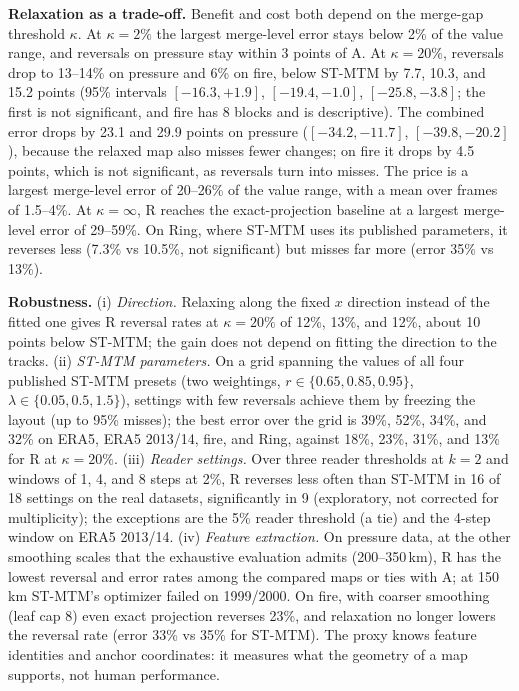 \documentclass[review]{vgtc}                 %
\begin{document}
\textbf{Relaxation as a trade-off.} Benefit and cost both depend on the merge-gap threshold $\kappa$. At $\kappa=2\%$ the largest merge-level error stays below 2\% of the value range, and reversals on pressure stay within 3 points of A. At $\kappa=20\%$, reversals drop to 13--14\% on pressure and 6\% on fire, below ST-MTM by 7.7, 10.3, and 15.2 points (95\% intervals $[-16.3,+1.9]$, $[-19.4,-1.0]$, $[-25.8,-3.8]$; the first is not significant, and fire has 8 blocks and is descriptive). The combined error drops by 23.1 and 29.9 points on pressure ($[-34.2,-11.7]$, $[-39.8,-20.2]$), because the relaxed map also misses fewer changes; on fire it drops by 4.5 points, which is not significant, as reversals turn into misses. The price is a largest merge-level error of 20--26\% of the value range, with a mean over frames of 1.5--4\%. At $\kappa=\infty$, R reaches the exact-projection baseline at a largest merge-level error of 29--59\%. On Ring, where ST-MTM uses its published parameters, it reverses less (7.3\% vs 10.5\%, not significant) but misses far more (error 35\% vs 13\%).

\textbf{Robustness.} (i) \emph{Direction.} Relaxing along the fixed $x$ direction instead of the fitted one gives R reversal rates at $\kappa=20\%$ of 12\%, 13\%, and 12\%, about 10 points below ST-MTM; the gain does not depend on fitting the direction to the tracks. (ii) \emph{ST-MTM parameters.} On a grid spanning the values of all four published ST-MTM presets (two weightings, $r\in\{0.65,0.85,0.95\}$, $\lambda\in\{0.05,0.5,1.5\}$), settings with few reversals achieve them by freezing the layout (up to 95\% misses); the best error over the grid is 39\%, 52\%, 34\%, and 32\% on ERA5, ERA5 2013/14, fire, and Ring, against 18\%, 23\%, 31\%, and 13\% for R at $\kappa=20\%$. (iii) \emph{Reader settings.} Over three reader thresholds at $k=2$ and windows of 1, 4, and 8 steps at 2\%, R reverses less often than ST-MTM in 16 of 18 settings on the real datasets, significantly in 9 (exploratory, not corrected for multiplicity); the exceptions are the 5\% reader threshold (a tie) and the 4-step window on ERA5 2013/14. (iv) \emph{Feature extraction.} On pressure data, at the other smoothing scales that the exhaustive evaluation admits (200--350\,km), R has the lowest reversal and error rates among the compared maps or ties with A; at 150\,km ST-MTM's optimizer failed on 1999/2000. On fire, with coarser smoothing (leaf cap 8) even exact projection reverses 23\%, and relaxation no longer lowers the reversal rate (error 33\% vs 35\% for ST-MTM). The proxy knows feature identities and anchor coordinates: it measures what the geometry of a map supports, not human performance.
\end{document}
